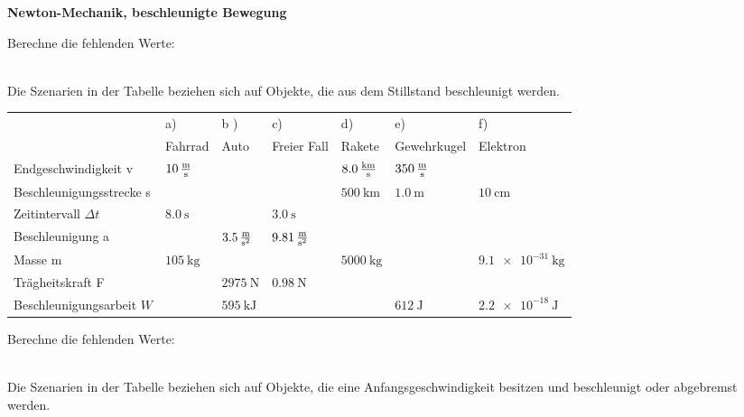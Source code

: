 \documentclass[a4paper]{article}
\begin{document}
{\bf Newton-Mechanik, beschleunigte Bewegung}
\begin{enumerate}[1.]
{\bf \item Berechne die fehlenden Werte:}\\
Die Szenarien in der Tabelle beziehen sich auf Objekte, die aus dem Stillstand beschleunigt werden.

\renewcommand{\arraystretch}{2}
\begin{tabular}{|p{4 cm}|p{1.6 cm}|p{1.8 cm}|p{1.8 cm}|p{1.8 cm}|p{1.8 cm}|p{2.0 cm}|}
	\hline
	 &a) & b ) & c) & d) & e) & f) \\
	 & Fahrrad & Auto & Freier Fall & Rakete & Gewehrkugel & Elektron \\
	\hline
	Endgeschwindigkeit v & $\SI{10}{\meter\over \second}$& & & $\SI{8,0}{\kilo\meter\over \second}$& $\SI{350}{\meter\over \second}$& \\
	\hline
	Beschleunigungsstrecke s & & & &$\SI{500}{\kilo\meter}$ & $\SI{1,0}{\meter}$&$\SI{10}{\centi\meter}$ \\
	\hline
	Zeitintervall $\Delta t$  & $\SI{8,0}{\second}$ & & $\SI{3,0}{\second}$& & & \\
	\hline
	Beschleunigung a & & $\SI{3,5}{\meter\over{\second^2}}$ &$\SI{9,81}{\meter\over{\second^2}}$ & & & \\
	\hline
	Masse m & $\SI{105}{\kilogram}$ & & & $\SI{5000}{\kilogram}$ &&  $\SI{9,1e-31}{\kilogram}$\\
	\hline
	Trägheitskraft F & & $\SI{2975}{\newton}$ &$\SI{0,98}{\newton}$ & & & \\
	\hline
	Beschleunigungsarbeit $W$ & & $\SI{595}{\kilo\joule}$ & & &$\SI{612}{\joule}$ &$\SI{2,2e-18}{\joule}$ \\
	\hline
\end{tabular}

{\bf \item Berechne die fehlenden Werte:}\\
Die Szenarien in der Tabelle beziehen sich auf Objekte, die eine Anfangsgeschwindigkeit besitzen und beschleunigt oder abgebremst werden.


\end{enumerate}
\end{document}
